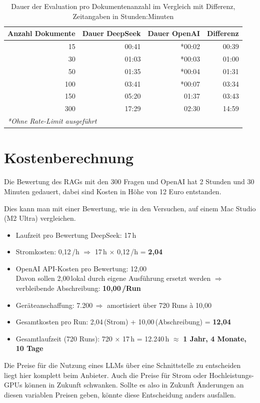 \begin{table}[h!]
    \centering
    \caption[OpenAI vs. DeepSeek Evaluationszeiten]{Dauer der Evaluation pro Dokumentenanzahl im Vergleich mit Differenz, Zeitangaben in Stunden:Minuten}
    \begin{tabular}{|r|r|r|r|}
        \hline
        \textbf{Anzahl Dokumente} & \textbf{Dauer DeepSeek } & \textbf{Dauer OpenAI} & \textbf{Differenz} \\
        \hline
        15   & 00:41 & *00:02 & 00:39 \\
        30   & 01:03 & *00:03 & 01:00 \\
        50   & 01:35 & *00:04 & 01:31 \\
        100  & 03:41 & *00:07 & 03:34 \\
        150  & 05:20 & 01:37 & 03:43 \\
        300  & 17:29 & 02:30 & 14:59 \\
        \hline
        \multicolumn{4}{l}{\textit{*Ohne Rate-Limit ausgeführt}} \\
    \end{tabular}
    \label{tab:evaluation_times}
\end{table}



\section{Kostenberechnung}

Die Bewertung des RAGs mit den 300 Fragen und OpenAI hat 2 Stunden und 30 Minuten gedauert, dabei sind Kosten in Höhe von 12 Euro entstanden.

Dies kann man mit einer Bewertung, wie in den Versuchen, auf einem Mac Studio (M2 Ultra) vergleichen.
\begin{itemize}
    \item Laufzeit pro Bewertung DeepSeek: 17\,h
    \item Stromkosten: 0,12\,\texteuro/h $\Rightarrow$ 17\,h $\times$ 0,12\,\texteuro/h = \textbf{2,04\,\texteuro}
    \item OpenAI API-Kosten pro Bewertung: 12,00\,\texteuro\\
          Davon sollen 2,00\,\texteuro lokal durch eigene Ausführung ersetzt werden $\Rightarrow$ verbleibende Abschreibung: \textbf{10,00\,\texteuro/Run}
    \item Geräteanschaffung: 7.200\,\texteuro $\Rightarrow$ amortisiert über 720 Runs à 10,00\,\texteuro
    \item Gesamtkosten pro Run: 2,04\,\texteuro (Strom) + 10,00\,\texteuro (Abschreibung) = \textbf{12,04\,\texteuro}
    \item Gesamtlaufzeit (720 Runs): 720 $\times$ 17\,h = 12.240\,h $\approx$ \textbf{1 Jahr, 4 Monate, 10 Tage}
\end{itemize}

Die Preise für die Nutzung eines LLMs über eine Schnittstelle zu entscheiden liegt hier komplett beim Anbieter.
Auch die Preise für Strom oder Hochleistungs-GPUs können in Zukunft schwanken.
Sollte es also in Zukunft Änderungen an diesen variablen Preisen geben, könnte diese Entscheidung anders ausfallen.
